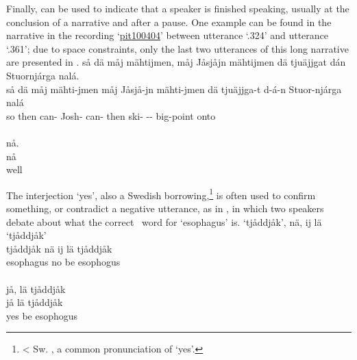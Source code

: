 Finally,  can be used to indicate that a speaker is finished speaking, usually at the conclusion of a narrative and after a pause. One example can be found in the narrative in the recording ‘\hyperlink{pit100404}{pit100404}’ between utterance ‘.324’ and utterance ‘.361’; due to space constraints, only the last two utterances of this long narrative are presented in . %
\ea\label{noEx1}
\glll	{} så dä måj mähtijmen, måj Jåsjåjn mähtijmen {\hspace{14pt}dä} tjuäjjgat dán Stuornjárga nalá.\\
	{} så dä måj mähti-jmen måj Jåsjå-jn mähti-jmen {\hspace{14pt}dä} tjuäjjga-t d-á-n Stuor-njárga nalá\\
	{} so then  can-  Josh- can- {\hspace{14pt}then} ski- -- big-point\BS{} onto\\\nopagebreak
{}\\	%
\glll	{} nå.\\
	{} nå\\
	{} well\\\nopagebreak
{}	
\z


The interjection  ‘yes’, also a Swedish borrowing,\footnote{< Sw. , a common pronunciation of  ‘yes’.} 
is often used to confirm something, or contradict a negative utterance, as in , in which two speakers debate about what the correct \PS\ word for ‘esophagus’ is. 
\ea\label{particleEx7}
\glll	{} ‘tjåddjåk’, nä, ij lä ‘tjåddjåk’\\
	{} tjåddjåk nä ij lä tjåddjåk\\
	{} esophagus\BS{} no \BS{} be\BS{} esophogus\BS{}\\\nopagebreak
{}\\
\glll	{} jå, lä tjåddjåk\\
	{} jå lä tjåddjåk\\
	{} yes be\BS{} esophogus\BS{}\\\nopagebreak
{}	
\z









%